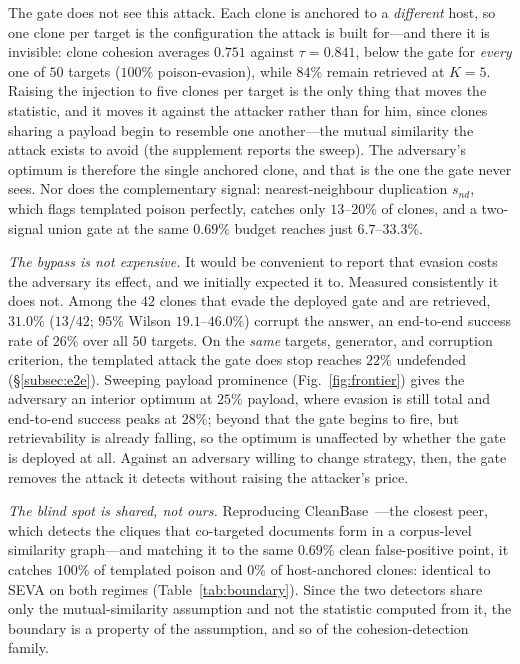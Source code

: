 \documentclass[10pt,journal,compsoc]{IEEEtran}
\begin{document}
The gate does not see this attack. Each clone is anchored to a \emph{different} host, so
one clone per target is the configuration the attack is built for---and there it is invisible:
clone cohesion averages $0.751$ against $\tau=0.841$, below the gate for \emph{every} one of
$50$ targets ($100\%$ poison-evasion), while $84\%$ remain retrieved at $K=5$. Raising the
injection to five clones per target is the only thing that moves the statistic, and it moves it
against the attacker rather than for him, since clones sharing a payload begin to resemble one
another---the mutual similarity the attack exists to avoid (the supplement reports the
sweep). The adversary's optimum is therefore the single anchored clone, and that is the one the
gate never sees. Nor does the complementary signal: nearest-neighbour
duplication $s_{nd}$, which flags templated poison perfectly, catches only $13$--$20\%$ of
clones, and a two-signal union gate at the same $0.69\%$ budget reaches just $6.7$--$33.3\%$.

\emph{The bypass is not expensive.} It would be convenient to report that evasion costs the
adversary its effect, and we initially expected it to. Measured consistently it does not. Among
the $42$ clones that evade the deployed gate and are retrieved, $31.0\%$ ($13/42$; $95\%$ Wilson
$19.1$--$46.0\%$) corrupt the answer, an end-to-end success rate of $26\%$ over all $50$
targets. On the \emph{same} targets, generator, and corruption criterion, the templated attack
the gate does stop reaches $22\%$ undefended (\S\ref{subsec:e2e}). Sweeping payload
prominence (Fig.~\ref{fig:frontier}) gives the adversary an interior optimum at $25\%$ payload,
where evasion is still total and end-to-end success peaks at $28\%$; beyond that the gate begins
to fire, but retrievability is already falling, so the optimum is unaffected by whether the gate
is deployed at all. Against an adversary willing to change strategy, then, the gate removes
the attack it detects without raising the attacker's price.

\emph{The blind spot is shared, not ours.} Reproducing CleanBase~\cite{cleanbase}---the closest
peer, which detects the cliques that co-targeted documents form in a corpus-level similarity
graph---and matching it to the same $0.69\%$ clean false-positive point, it catches $100\%$ of
templated poison and $0\%$ of host-anchored clones: identical to SEVA on both regimes
(Table~\ref{tab:boundary}). Since the two detectors share only the mutual-similarity assumption
and not the statistic computed from it, the boundary is a property of the assumption, and so of
the cohesion-detection family.
\end{document}
